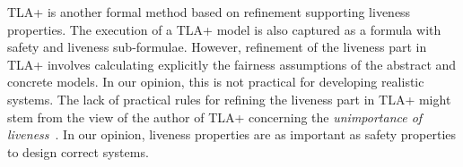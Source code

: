 %
%
%
TLA+\cite{DBLP_books_aw_Lamport2002} is another formal method based on
refinement supporting liveness properties.  The
execution of a TLA+ model is also captured as a formula with safety
and liveness sub-formulae.  However, refinement of the liveness part
in TLA+ involves calculating explicitly the fairness assumptions of the
abstract and concrete models.  In our opinion, this is not practical for 
developing realistic systems.  The
lack of practical rules for refining the liveness part in TLA+ might 
stem from the view of the author of TLA+ concerning the
\emph{unimportance of liveness}~\cite[Chapter
8]{DBLP_books_aw_Lamport2002}.  In our opinion, liveness
properties are as important as safety properties to design
correct systems.

